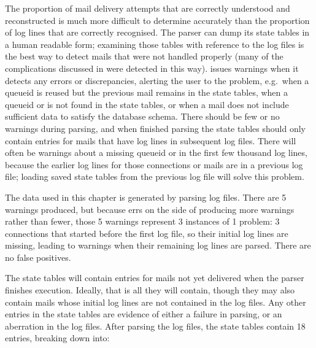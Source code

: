 \label{mails-covered}

The proportion of mail delivery attempts that are correctly understood and
reconstructed is much more difficult to determine accurately than the
proportion of log lines that are correctly recognised.  The parser can dump
its state tables in a human readable form; examining those tables with
reference to the log files is the best way to detect mails that were not
handled properly (many of the complications discussed in
 were detected in this way).  \parsername{}
issues warnings when it detects any errors or discrepancies, alerting the
user to the problem, e.g.\ when a queueid is reused but the previous mail
remains in the state tables, when a queueid or  is not found
in the state tables, or when a mail does not include sufficient data to
satisfy the database schema.  There should be few or no warnings during
parsing, and when finished parsing the state tables should only contain
entries for mails that have log lines in subsequent log files.  There will
often be warnings about a missing queueid or  in the first few
thousand log lines, because the earlier log lines for those connections or
mails are in a previous log file; loading saved state tables from the
previous log file will solve this problem.

The data used in this chapter is generated by parsing \numberOFlogFILES{}
log files.  There are 5 warnings produced, but because \parsername{} errs
on the side of producing more warnings rather than fewer, those 5 warnings
represent 3 instances of 1 problem: 3 connections that started before the
first log file, so their initial log lines are missing, leading to warnings
when their remaining log lines are parsed.  There are no false positives.

The state tables will contain entries for mails not yet delivered when the
parser finishes execution.  Ideally, that is all they will contain, though
they may also contain mails whose initial log lines are not contained in
the log files.  Any other entries in the state tables are evidence of
either a failure in parsing, or an aberration in the log files.  After
parsing the \numberOFlogFILES{} log files, the state tables contain 18
entries, breaking down into:

